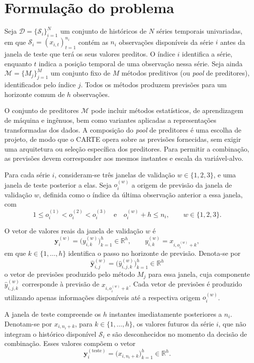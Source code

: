 \section{Formulação do problema}
\label{sec:formulacao}

Seja $\mathcal{D} = \{\mathcal{S}_i\}_{i=1}^{N}$ um conjunto de históricos de $N$ séries temporais univariadas, em que $\mathcal{S}_i = (x_{i,t})_{t=1}^{n_i}$ contém as $n_i$ observações disponíveis da série $i$ antes da janela de teste que terá os seus valores preditos. O índice $i$ identifica a série, enquanto $t$ indica a posição temporal de uma observação nessa série. Seja ainda $\mathcal{M} = \{M_j\}_{j=1}^{M}$ um conjunto fixo de $M$ métodos preditivos (ou \textit{pool} de preditores), identificados pelo índice $j$. Todos os métodos produzem previsões para um horizonte comum de $h$ observações.

O conjunto de preditores $\mathcal{M}$ pode incluir métodos estatísticos, de aprendizagem de máquina e ingênuos, bem como variantes aplicadas a representações transformadas dos dados. A composição do \textit{pool} de preditores é uma escolha de projeto, de modo que o CARTE opera sobre as previsões fornecidas, sem exigir uma arquitetura ou seleção específica dos preditores. Para permitir a combinação, as previsões devem corresponder aos mesmos instantes e escala da variável-alvo.

Para cada série $i$, consideram-se três janelas de validação $w \in \{1,2,3\}$, e uma janela de teste posterior a elas. Seja $o_i^{(w)}$ a origem de previsão da janela de validação $w$, definida como o índice da última observação anterior a essa janela, com
\[
    1 \leq o_i^{(1)} < o_i^{(2)} < o_i^{(3)}
    \quad \text{e} \quad
    o_i^{(w)} + h \leq n_i,
    \qquad w \in \{1,2,3\}.
\]

O vetor de valores reais da janela de validação $w$ é
\[
    \mathbf{y}_i^{(w)}
    =
    \bigl(y_{i,k}^{(w)}\bigr)_{k=1}^{h}
    \in \mathbb{R}^{h},
    \qquad
    y_{i,k}^{(w)}
    =
    x_{i,o_i^{(w)}+k},
\]
em que $k \in \{1,\dots,h\}$ identifica o passo no horizonte de previsão. Denota-se por
\[
    \hat{\mathbf{y}}_{i,j}^{(w)}
    =
    \bigl(\hat{y}_{i,j,k}^{(w)}\bigr)_{k=1}^{h}
    \in \mathbb{R}^{h}
\]
o vetor de previsões produzido pelo método $M_j$ para essa janela, cuja componente $\hat{y}_{i,j,k}^{(w)}$ corresponde à previsão de $x_{i,o_i^{(w)}+k}$. Cada vetor de previsões é produzido utilizando apenas informações disponíveis até a respectiva origem $o_i^{(w)}$.

A janela de teste compreende os $h$ instantes imediatamente posteriores a $n_i$. Denotam-se por $x_{i,n_i+k}$, para $k \in \{1,\dots,h\}$, os valores futuros da série $i$, que não integram o histórico disponível $\mathcal{S}_i$ e são desconhecidos no momento da decisão de combinação. Esses valores compõem o vetor
\[
    \mathbf{y}_i^{(\mathrm{teste})}
    =
    \bigl(x_{i,n_i+k}\bigr)_{k=1}^{h}
    \in \mathbb{R}^{h}.
\]

